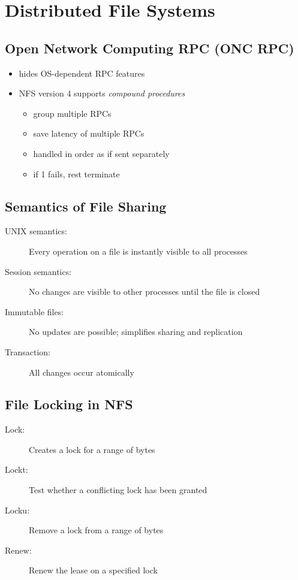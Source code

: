 \section{Distributed File Systems}
\subsection{Open Network Computing RPC (ONC RPC)}
\begin{itemize}
	\item hides OS-dependent RPC features
	\item NFS version 4 supports \textit{compound procedures}
	\begin{itemize}
		\item group multiple RPCs
		\item save latency of multiple RPCs
		\item handled in order as if sent separately
		\item if 1 fails, rest terminate
	\end{itemize}	
\end{itemize}

\subsection{Semantics of File Sharing}
\begin{description}
	\item[UNIX semantics:] Every operation on a file is instantly visible to all processes
	\item[Session semantics:] No changes are visible to other processes until the file is closed
	\item[Immutable files:] No updates are possible; simplifies sharing and replication
	\item[Transaction:] All changes occur atomically	
\end{description}

\subsection{File Locking in NFS}
\begin{description}
	\item[Lock:] Creates a lock for a range of bytes
	\item[Lockt:] Test whether a conflicting lock has been granted
	\item[Locku:] Remove a lock from a range of bytes
	\item[Renew:] Renew the lease on a specified lock
\end{description}

